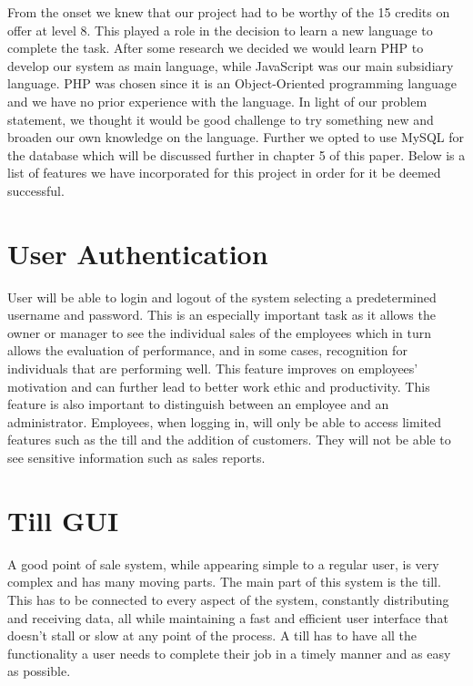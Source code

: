 \newline
From the onset we knew that our project had to be worthy of the 15 credits on offer at level 8. This played a role in the decision to learn a new language to complete the task. After some research we decided we would learn PHP to develop our system as main language, while JavaScript was our main subsidiary language. PHP was chosen since it is an Object-Oriented programming language and we have no prior experience with the language. In light of our problem statement, we thought it would be good challenge to try something new and broaden our own knowledge on the language. Further we opted to use MySQL for the database which will be discussed further in chapter 5 of this paper. Below is a list of features we have incorporated for this project in order for it be deemed successful. 

\section{User Authentication}

User will be able to login and logout of the system selecting a predetermined username and password. This is an especially important task as it allows the owner or manager to see the individual sales of the employees which in turn allows the evaluation of performance, and in some cases, recognition for individuals that are performing well. This feature improves on employees’ motivation and can further lead to better work ethic and productivity. This feature is also important to distinguish between an employee and an administrator. Employees, when logging in, will only be able to access limited features such as the till and the addition of customers. They will not be able to see sensitive information such as sales reports.

\section{Till GUI}

A good point of sale system, while appearing simple to a regular user, is very complex and has many moving parts. The main part of this system is the till. This has to be connected to every aspect of the system, constantly distributing and receiving data, all while maintaining a fast and efficient user interface that doesn’t stall or slow at any point of the process.
\newline
A till has to have all the functionality a user needs to complete their job in a timely manner and as easy as possible. 

